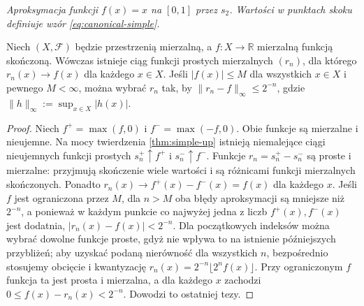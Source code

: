 \begin{center}

\smallskip
\emph{Aproksymacja funkcji $f(x)=x$ na $[0,1]$ przez $s_2$.
Wartości w punktach skoku definiuje wzór \eqref{eq:canonical-simple}.}
\end{center}

\begin{twierdzenie}
\label{thm:simple-real-approx}
Niech $(X,\mathcal F)$ będzie przestrzenią mierzalną,
a $f:X\to\mathbb R$ mierzalną funkcją skończoną.
Wówczas istnieje ciąg funkcji prostych mierzalnych
$(r_n)$, dla którego $r_n(x)\to f(x)$ dla każdego $x\in X$.
Jeśli $|f(x)|\le M$ dla wszystkich $x\in X$ i pewnego
$M<\infty$, można wybrać $r_n$ tak, by
$\|r_n-f\|_\infty\le2^{-n}$, gdzie
$\|h\|_\infty:=\sup_{x\in X}|h(x)|$.
\end{twierdzenie}
\begin{proof}
Niech $f^+=\max(f,0)$ i $f^-=\max(-f,0)$.
Obie funkcje są mierzalne i nieujemne.
Na mocy twierdzenia \ref{thm:simple-up} istnieją
niemalejące ciągi nieujemnych funkcji prostych
$s_n^+\uparrow f^+$ i $s_n^-\uparrow f^-$.
Funkcje $r_n=s_n^+-s_n^-$ są proste i mierzalne:
przyjmują skończenie wiele wartości i są różnicami
funkcji mierzalnych skończonych. Ponadto
$r_n(x)\to f^+(x)-f^-(x)=f(x)$ dla każdego $x$.
Jeśli $f$ jest ograniczona przez $M$, dla
$n>M$ oba błędy aproksymacji są mniejsze niż
$2^{-n}$, a ponieważ w każdym punkcie co najwyżej
jedna z liczb $f^+(x),f^-(x)$ jest dodatnia,
$|r_n(x)-f(x)|<2^{-n}$. Dla początkowych indeksów
można wybrać dowolne funkcje proste, gdyż nie
wpływa to na istnienie późniejszych przybliżeń;
aby uzyskać podaną nierówność dla wszystkich $n$,
bezpośrednio stosujemy obcięcie i kwantyzację
$r_n(x)=2^{-n}\lfloor2^nf(x)\rfloor$.
Przy ograniczonym $f$ funkcja ta jest prosta i
mierzalna, a dla każdego $x$ zachodzi
$0\le f(x)-r_n(x)<2^{-n}$. Dowodzi to ostatniej tezy.
\end{proof}

